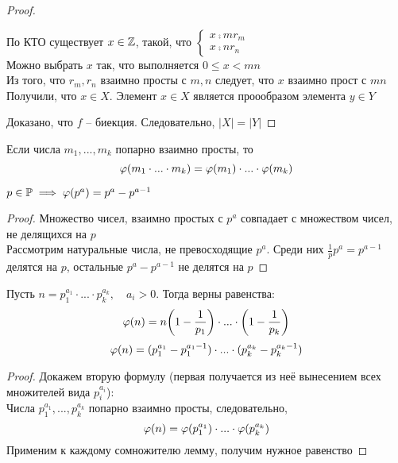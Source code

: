 \begin{proof}
\begin{itemize}
		По КТО существует $x \in \mathbb{Z}$, такой, что $
		\begin{cases}
			x \comp{m} r_m \\
			x \comp{n} r_n
		\end{cases} $ \\
		Можно выбрать $x$ так, что выполняется $0 \le x < mn$ \\
		Из того, что $r_m, r_n$ взаимно просты с $m, n$ следует, что $x$ взаимно прост с $mn$ \\
		Получили, что $x \in X$. Элемент $x \in X$ является проообразом элемента $y \in Y$
	\end{itemize}
	Доказано, что $f$ -- биекция. Следовательно, $|X| = |Y|$
\end{proof}

\begin{implication}
	Если числа $m_1, ..., m_k$ попарно взаимно просты, то
	$$ \varphi(m_1 \cdot ... \cdot m_k) = \varphi(m_1) \cdot ... \cdot \varphi(m_k) $$
\end{implication}

\begin{lemma}
	$ p \in \mathbb{P} \implies \varphi(p^a) = p^a - p^{a - 1} $
\end{lemma}

\begin{proof}
	Множество чисел, взаимно простых с $p^a$ совпадает с множеством чисел, не делящихся на $p$ \\
	Рассмотрим натуральные числа, не превосходящие $p^a$. Среди них $\frac1p p^a = p^{a - 1}$ делятся на $p$, остальные $p^a - p^{a - 1}$ не делятся на $p$
\end{proof}

\begin{theorem}
	Пусть $n = p_1^{a_1} \cdot ... \cdot p_k^{a_k}, \quad a_i > 0 $. Тогда верны равенства:
	$$ \varphi(n) = n \bigg(1 - \frac1{p_1} \bigg) \cdot ... \cdot \bigg( 1 - \frac1{p_k} \bigg) $$
	$$ \varphi(n) = (p_1^{a_1} - p_1^{a_1 -1}) \cdot ... \cdot (p_k^{a_k} - p_k^{a_k - 1}) $$
\end{theorem}

\begin{proof}
	Докажем вторую формулу (первая получается из неё вынесением всех множителей вида $p_i^{a_i}$): \\
	Числа $p_1^{a_1}, ..., p_k^{a_k}$ попарно взаимно просты, следовательно,
	$$ \varphi(n) = \varphi(p_1^{a_1}) \cdot ... \cdot \varphi(p_k^{a_k}) $$
	Применим к каждому сомножителю лемму, получим нужное равенство
\end{proof}

